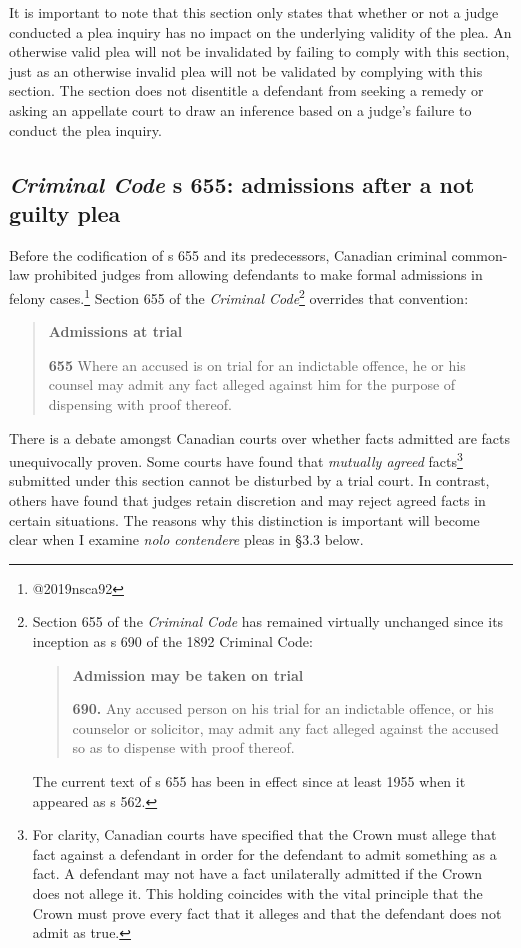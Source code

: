 It is important to note that this section only states that whether or not a judge conducted a plea inquiry has no impact on the underlying validity of the plea. An otherwise valid plea will not be invalidated by failing to comply with this section, just as an otherwise invalid plea will not be validated by complying with this section. The section does not disentitle a defendant from seeking a remedy or asking an appellate court to draw an inference based on a judge's failure to conduct the plea inquiry.

\subsection{\textit{Criminal Code} s 655: admissions after a not guilty plea}

Before the codification of s 655 and its predecessors, Canadian criminal common-law prohibited judges from allowing defendants to make formal admissions in felony cases.\footnote{@2019nsca92} Section 655 of the \textit{Criminal Code}\footnote{Section 655 of the \textit{Criminal Code} has remained virtually unchanged since its inception as s 690 of the 1892 Criminal Code:

\begin{quote}
    \textbf{Admission may be taken on trial}
    
    \textbf{690.} Any accused person on his trial for an indictable offence, or his counselor or solicitor, may admit any fact alleged against the accused so as to dispense with proof thereof.
\end{quote}

The current text of s 655 has been in effect since at least 1955 when it appeared as s 562.} overrides that convention:

\begin{quote}
    \textbf{Admissions at trial}
    
    \textbf{655} Where an accused is on trial for an indictable offence, he or his counsel may admit any fact alleged against him for the purpose of dispensing with proof thereof.
\end{quote}

There is a debate amongst Canadian courts over whether facts admitted are facts unequivocally proven. Some courts have found that \textit{mutually agreed} facts\footnote{For clarity, Canadian courts have specified that the Crown must allege that fact against a defendant in order for the defendant to admit something as a fact. A defendant may not have a fact unilaterally admitted if the Crown does not allege it. This holding coincides with the vital principle that the Crown must prove every fact that it alleges and that the defendant does not admit as true.} submitted under this section cannot be disturbed by a trial court. In contrast, others have found that judges retain discretion and may reject agreed facts in certain situations. The reasons why this distinction is important will become clear when I examine \textit{nolo contendere} pleas in §3.3 below.